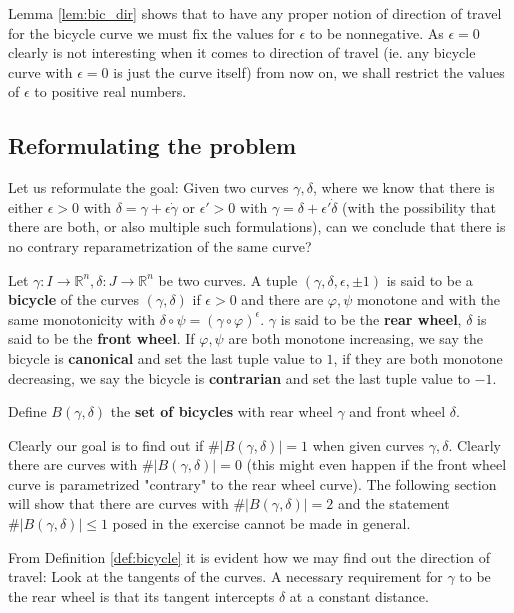 \documentclass[11pt]{article}
\begin{document}
\begin{remark}
Lemma \ref{lem:bic_dir} shows that to have any proper notion of direction of travel for the bicycle curve we must fix the values for $\epsilon$ to be nonnegative. As $\epsilon = 0$ clearly is not interesting when it comes to direction of travel (ie. any bicycle curve with $\epsilon = 0$ is just the curve itself) from now on, we shall restrict the values of $\epsilon$ to positive real numbers.
\end{remark}

\subsection{Reformulating the problem}

\begin{remark}
Let us reformulate the goal: Given two curves $\gamma, \delta$, where we know that there is either $\epsilon>0$ with $\delta = \gamma+\epsilon \dot\gamma$ or $\epsilon'>0$ with $\gamma = \delta+\epsilon'\dot\delta$ (with the possibility that there are both, or also multiple such formulations), can we conclude that there is no contrary reparametrization of the same curve?
\end{remark}
\begin{definition}\label{def:bicycle}
Let $\gamma:I\to \mathbb R^n, \delta: J\to \mathbb R^n$ be two curves. A tuple $(\gamma, \delta, \epsilon, \pm1)$ is said to be a \textbf{bicycle} of the curves $(\gamma, \delta)$ if $\epsilon > 0$ and there are $\varphi, \psi$ monotone and with the same monotonicity with $\delta\circ \psi = (\gamma\circ \varphi)^\epsilon$. $\gamma$ is said to be the \textbf{rear wheel}, $\delta$ is said to be the \textbf{front wheel}. If $\varphi, \psi$ are both monotone increasing, we say the bicycle is \textbf{canonical} and set the last tuple value to $1$, if they are both monotone decreasing, we say the bicycle is \textbf{contrarian} and set the last tuple value to $-1$.
\end{definition}
\begin{definition}
Define $B(\gamma, \delta)$
the\textbf{ set of bicycles} with rear wheel $\gamma$ and front wheel $\delta$.
\end{definition}
\begin{remark}
Clearly our goal is to find out if $\#|B(\gamma,\delta)| = 1$ when given curves $\gamma,\delta$. Clearly there are curves with $\#|B(\gamma,\delta)| = 0$ (this might even happen if the front wheel curve is parametrized "contrary" to the rear wheel curve). The following section will show that there are curves with $\#|B(\gamma,\delta)| = 2$ and the statement $\#|B(\gamma,\delta)|\leq 1$ posed in the exercise cannot be made in general.
\end{remark}
\begin{remark}\label{rem:alg}
From Definition \ref{def:bicycle} it is evident how we may find out the direction of travel: Look at the tangents of the curves. A necessary requirement for $\gamma$ to be the rear wheel is that its tangent intercepts $\delta$ at a constant distance. 
\end{remark}
\end{document}
